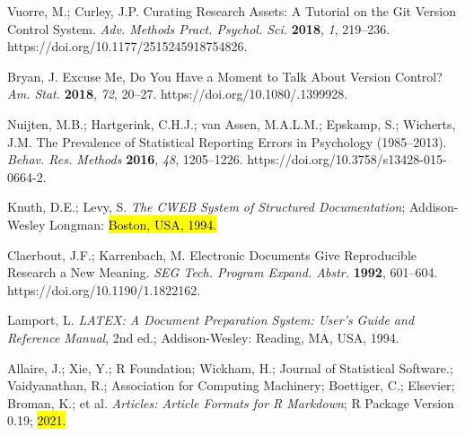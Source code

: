 \documentclass[psych,tutorial,accept,moreauthors,pdftex]{Definitions/mdpi}
\begin{document}
\begin{thebibliography}{999}
Vuorre, M.; Curley, J.P. Curating Research Assets: A Tutorial on the Git Version Control System. \emph{Adv. Methods Pract. Psychol. Sci.} \textbf{2018}, \emph{1}, 219--236. https://doi.org/10.1177/2515245918754826.

Bryan, J. Excuse Me, Do You Have a Moment to Talk About Version Control? \emph{Am. Stat.} \textbf{2018}, \emph{72}, 20--27. https://doi.org/10.1080/.1399928.

Nuijten, M.B.; Hartgerink, C.H.J.; van Assen, M.A.L.M.; Epskamp, S.; Wicherts, J.M. The Prevalence of Statistical Reporting Errors in Psychology (1985--2013). \emph{Behav. Res. Methods} \textbf{2016}, \emph{48}, 1205--1226. https://doi.org/10.3758/s13428-015-0664-2.

Knuth, D.E.; Levy, S. \emph{The CWEB System of Structured Documentation}; Addison-Wesley Longman: \hl{Boston, USA, 1994.}


Claerbout, J.F.; Karrenbach, M. Electronic Documents Give Reproducible Research a New Meaning. \emph{SEG Tech. Program Expand. Abstr.} \textbf{1992}, 601--604. https://doi.org/10.1190/1.1822162.


Lamport, L. \emph{LATEX: A Document Preparation System: User’s Guide and Reference Manual}, 2nd ed.; Addison-Wesley: Reading, MA, USA, 1994.


Allaire, J.; Xie, Y.; R Foundation; Wickham, H.; Journal of Statistical Software.; Vaidyanathan, R.; Association for Computing Machinery; Boettiger, C.; Elsevier; Broman, K.; et al. \emph{Articles: Article Formats for R Markdown}; R Package Version 0.19; \hl{2021.}%



\end{thebibliography}
\end{document}
